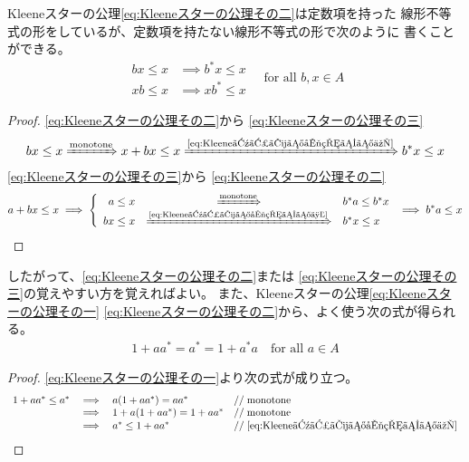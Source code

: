 {	Kleeneスターの公理\eqref{eq:Kleeneスターの公理その二}は定数項を持った
	線形不等式の形をしているが、定数項を持たない線形不等式の形で次のように
	書くことができる。
	\begin{equation}\label{eq:Kleeneスターの公理その三}\begin{split}
			bx \le x &\implies b^*x\le x \\
			xb \le x &\implies xb^*\le x 
	\end{split}
		\quad\text{for all } b,x\in A
	\end{equation}
	\begin{proof} %
		\eqref{eq:Kleeneスターの公理その二}から
		\eqref{eq:Kleeneスターの公理その三}
		\begin{equation*}\begin{split}
			bx\le x\ximplies{\text{monotone}}
			x + bx\le x\ximplies{\text{\eqref{eq:Kleeneスターの公理その二}}}
			b^*x\le x
		\end{split}\end{equation*}
		\eqref{eq:Kleeneスターの公理その三}から
		\eqref{eq:Kleeneスターの公理その二}
		\begin{equation*}\begin{split}
			a + bx\le x\implies \left\{\begin{array}{rcl}
				a\le x &\ximplies{\text{monotone}}& b^*a\le b^*x \\
				bx\le x
				&\ximplies{\text{\eqref{eq:Kleeneスターの公理その三}}}&
				b^*x\le x
			\end{array}\right. \implies b^*a\le x
		\end{split}\end{equation*}
	\end{proof} %
	したがって、\eqref{eq:Kleeneスターの公理その二}または
	\eqref{eq:Kleeneスターの公理その三}の覚えやすい方を覚えればよい。
	また、Kleeneスターの公理\eqref{eq:Kleeneスターの公理その一}
	\eqref{eq:Kleeneスターの公理その二}から、よく使う次の式が得られる。
	\begin{equation*}\begin{split}
		1 + aa^* = a^* = 1 + a^*a \quad\text{for all } a\in A
	\end{split}\end{equation*}
	\begin{proof} %
		\eqref{eq:Kleeneスターの公理その一}より次の式が成り立つ。
		\begin{equation*}\begin{array}{rcll}
			1 + aa^* \le a^* &\implies& a(1 + aa^*) = aa^* &//\;\text{monotone} \\
			&\implies& 1 + a(1 + aa^*) = 1 + aa^* &//\;\text{monotone} \\
			&\implies& a^*\le 1 + aa^* 
			&//\;\text{\eqref{eq:Kleeneスターの公理その二}}
		\end{array}\end{equation*}
	\end{proof} %

}
